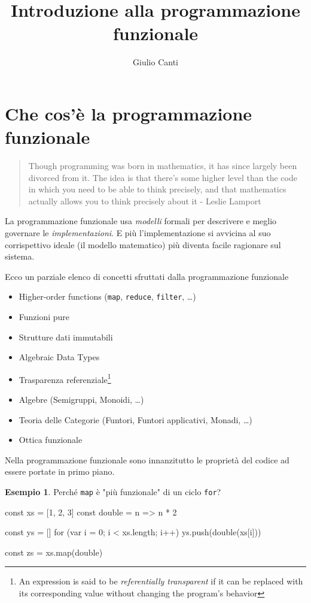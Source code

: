 \documentclass[12pt]{article}
\title{
  Introduzione alla programmazione funzionale
}
\author{Giulio Canti}
\theoremstyle{definition}
\newtheorem{example}{Esempio}[section]
\newenvironment{code}
  {\vspace{0.5cm} \VerbatimEnvironment\begin{typescriptcode}}
  {\end{typescriptcode} \vspace{0.2cm}}
\begin{document}
\maketitle

\tableofcontents

\newpage

\section{Che cos'è la programmazione funzionale}

\begin{quote}
Though programming was born in mathematics, it has since largely been divorced from it.
The idea is that there's some higher level than the code in which you need to be able to think precisely,
and that mathematics actually allows you to think precisely about it - Leslie Lamport
\end{quote}

La programmazione funzionale usa \emph{modelli} formali per descrivere e meglio governare le \emph{implementazioni}.
E più l'implementazione si avvicina al suo corrispettivo ideale (il modello matematico)
più diventa facile ragionare sul sistema.

Ecco un parziale elenco di concetti sfruttati dalla programmazione funzionale

\begin{itemize}
  \item Higher-order functions (\texttt{map}, \texttt{reduce}, \texttt{filter},  \ldots)
  \item Funzioni pure
  \item Strutture dati immutabili
  \item Algebraic Data Types
  \item Trasparenza referenziale\footnote{An expression is said to be \emph{referentially transparent} if it can be replaced with its corresponding value without changing the program's behavior}
  \item Algebre (Semigruppi, Monoidi, \ldots)
  \item Teoria delle Categorie (Funtori, Funtori applicativi, Monadi, \ldots)
  \item Ottica funzionale
\end{itemize}

Nella programmazione funzionale sono innanzitutto le proprietà del codice ad essere portate in primo piano.

\begin{example}
Perché \texttt{map} è "più funzionale" di un ciclo \texttt{for}?

\begin{code}
const xs = [1, 2, 3]
const double = n => n * 2

const ys = []
for (var i = 0; i < xs.length; i++) {
  ys.push(double(xs[i]))
}

const zs = xs.map(double)
\end{code}

\end{example}
\end{document}
